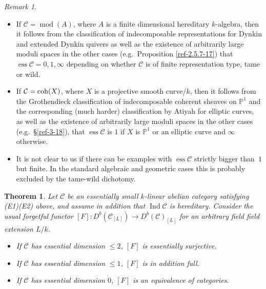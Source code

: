 \documentclass{amsart}
\numberwithin{equation}{section}
\let\cal\mathcal
\let\blb\mathbb
\newtheorem{theorems}[lemmas]{Theorem}
\theoremstyle{definition}
\theoremstyle{remark}
\newtheorem{remarks}[lemmas]{Remark}
\begin{document}
\begin{remarks}
\label{ref-5.2.2-31}
\begin{itemize}
\item If ${{\cal C}}={\operatorname{mod}}(A)$, where $A$ is a finite dimensional hereditary
$k$-algebra, then it follows from the classification of indecomposable representations
for Dynkin and extended Dynkin quivers \cite{Gabriel2,Ringel4} as well
as the existence of arbitrarily large moduli spaces in the other cases (e.g.\ Proposition \ref{ref-2.5.7-17})
that 
${\operatorname{ess}} {{\cal C}}=0,1,\infty$ depending on whether ${{\cal C}}$
is of finite representation type, tame or wild.
\item If ${{\cal C}}={\mathop{\text{\upshape{coh}}}}(X)$, where $X$ is a projective smooth curve/$k$, then it follows from the Grothendieck
classification of indecomposable coherent sheaves on ${{\blb P}}^1$ and the corresponding (much harder) classification by Atiyah
for elliptic curves, as well as the existence of arbitrarily large moduli spaces in the other cases (e.g.\ \S\ref{ref-3-18}),
that 
${\operatorname{ess}}{{\cal C}}$ is $1$ if $X$ is ${{\blb P}}^1$ or an elliptic curve and $\infty$
otherwise. 
\item It is not clear to us if there can be examples with ${\operatorname{ess}} {{\cal C}}$ strictly
bigger than~$1$ but finite. In the standard algebraic and geometric cases this is probably excluded
by the tame-wild dichotomy.
\end{itemize}
\end{remarks}
\begin{theorems} \label{ref-5.2.3-32}  Let ${{\cal C}}$ be an essentially small
  $k$-linear abelian category satisfying (E1)(E2) above, and assume in addition that $\operatorname{Ind} {{\cal C}}$ is hereditary. 
Consider the usual 
  forgetful functor $[F]:D^b({{\cal C}}_{[L]}){\rightarrow} D^b({{\cal C}})_{[L]}$ for an arbitrary field field extension
$L/k$.
\begin{itemize}
\item If ${{\cal C}}$ has essential dimension $\le 2$, $[F]$ is essentially surjective.
\item If ${{\cal C}}$ has essential dimension $\le 1$, $[F]$ is in addition full.
\item If ${{\cal C}}$ has essential dimension $0$, $[F]$ is an equivalence
of categories. 
\end{itemize}
\end{theorems}
\end{document}
